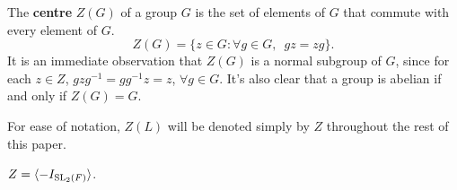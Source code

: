 \begin{definition}
\leanok
The \textbf{centre} $Z(G)$ of a group $G$ is the set of elements of  $G$ that commute with every element of $G$.
\begin {equation*} Z(G) = \{ z \in G : \forall g \in G, \hspace{6pt} gz=zg \}. \end{equation*}
It is an immediate observation that $Z(G)$ is a normal subgroup of $G$, 
since for each $z \in Z$, $gzg^{-1} = gg^{-1}z = z$, $\forall g \in G$. It's also clear that a group is abelian if and only if $Z(G)=G$.
\end{definition}

For ease of notation, $Z(L)$ will be denoted simply by $Z$ throughout the rest of this paper.

\begin{lemma}
\label{SpecialSubgroups.center_SL2_eq_Z}
\leanok
$Z = \langle - I_{\operatorname{SL}_2(F)}\rangle$.
\end{lemma}

